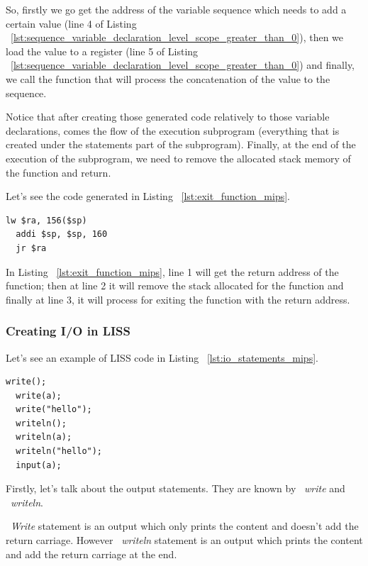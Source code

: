 \documentclass[
  oneside,
  11pt, a4paper,
  footinclude=true,
  headinclude=true,
  cleardoublepage=empty
]{scrbook}
\begin{document}
So, firstly we go get the address of the variable sequence which needs to add a certain value (line 4 of Listing ~\ref{lst:sequence_variable_declaration_level_scope_greater_than_0}), then we load the value to a register (line 5 of Listing ~\ref{lst:sequence_variable_declaration_level_scope_greater_than_0}) and finally, we call the function that will process the concatenation of the value to the sequence.

Notice that after creating those generated code relatively to those variable declarations, comes the flow of the execution subprogram (everything that is created under the statements part of the subprogram). Finally, at the end of the execution of the subprogram, we need to remove the allocated stack memory of the function and return.

Let's see the code generated in Listing ~\ref{lst:exit_function_mips}.

\begin{lstlisting}[caption={Exiting the function in MIPS assembly code},label={lst:exit_function_mips}]
  lw $ra, 156($sp)		
  addi $sp, $sp, 160		
  jr $ra	
\end{lstlisting}

In Listing ~\ref{lst:exit_function_mips}, line 1 will get the return address of the function; then at line 2 it will remove the stack allocated for the function and finally at line 3, it will process for exiting the function with the return address.

\subsubsection{Creating I/O in LISS}


Let's see an example of LISS code in Listing ~\ref{lst:io_statements_mips}.

\begin{lstlisting}[caption={Example of I/O statements in LISS},label={lst:io_statements_mips}]
  write();
  write(a);
  write("hello");
  writeln();
  writeln(a);
  writeln("hello");
  input(a);
\end{lstlisting}

Firstly, let's talk about the output statements. They are known by ~\textit{write} and ~\textit{writeln}.

~\textit{Write} statement is an output which only prints the content and doesn't add the return carriage. However ~\textit{writeln} statement is an output which prints the content and add the return carriage at the end.
\end{document}
